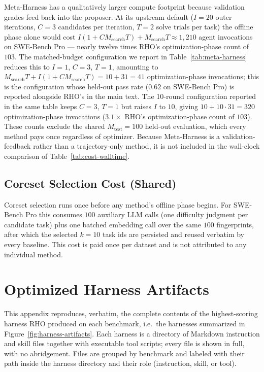 \documentclass{llmxive}
\providecommand{\method}{\textsc{RHO}}
\providecommand{\nolinenumbers}{}
\begin{document}
Meta-Harness has a qualitatively larger compute footprint because validation grades feed back into the proposer.
At its upstream default ($I=20$ outer iterations, $C=3$ candidates per iteration, $T=2$ solve trials per task) the offline phase alone would cost
$I (1 + C M_{\mathrm{search}} T) + M_{\mathrm{search}} T \approx 1{,}210$
agent invocations on SWE-Bench Pro --- nearly twelve times \method{}'s optimization-phase count of $103$.
The matched-budget configuration we report in Table~\ref{tab:meta-harness} reduces this to $I=1$, $C=3$, $T=1$, amounting to $M_{\mathrm{search}} T + I (1 + C M_{\mathrm{search}} T) = 10 + 31 = 41$ optimization-phase invocations; this is the configuration whose held-out pass rate ($0.62$ on SWE-Bench Pro) is reported alongside \method{}'s in the main text.
The 10-round configuration reported in the same table keeps $C=3$, $T=1$ but raises $I$ to $10$, giving $10 + 10 \cdot 31 = 320$ optimization-phase invocations ($3.1\times$ \method{}'s optimization-phase count of $103$).
These counts exclude the shared $M_{\mathrm{test}}=100$ held-out evaluation, which every method pays once regardless of optimizer.
Because Meta-Harness is a validation-feedback rather than a trajectory-only method, it is not included in the wall-clock comparison of Table~\ref{tab:cost-walltime}.

\subsection{Coreset Selection Cost (Shared)}

 Coreset selection runs once before any method's offline phase begins.
For SWE-Bench Pro this consumes $100$ auxiliary LLM calls (one difficulty judgment per candidate task) plus one batched embedding call over the same $100$ fingerprints, after which the selected $k=10$ task ids are persisted and reused verbatim by every baseline.
This cost is paid once per dataset and is not attributed to any individual method.



\nolinenumbers
\section{Optimized Harness Artifacts}\label{app:artifacts}

This appendix reproduces, verbatim, the complete contents of the highest-scoring harness \method{} produced on each benchmark, i.e.\ the harnesses summarized in Figure~\ref{fig:harness-artifacts}. Each harness is a directory of Markdown instruction and skill files together with executable tool scripts; every file is shown in full, with no abridgement. Files are grouped by benchmark and labeled with their path inside the harness directory and their role (instruction, skill, or tool).
\end{document}
